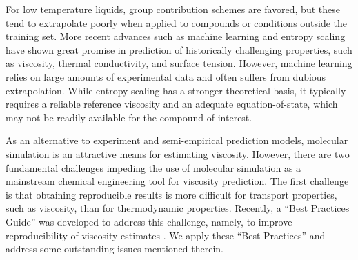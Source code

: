 \documentclass[preprint,review,12pt]{elsarticle}
\begin{document}
    For low temperature liquids, group contribution schemes are favored, but these tend to extrapolate poorly when applied to compounds or conditions outside the training set. More recent advances such as machine learning \cite{Mulero2017,Lee2017} and entropy scaling \cite{Lotgering2015} have shown great promise in prediction of historically challenging properties, such as viscosity, thermal conductivity, and surface tension. However, machine learning relies on large amounts of experimental data and often suffers from dubious extrapolation. While entropy scaling has a stronger theoretical basis, it typically requires a reliable reference viscosity and an adequate equation-of-state, which may not be readily available for the compound of interest.
	
	
	
	
	
	
	
	As an alternative to experiment and semi-empirical prediction models, molecular simulation is an attractive means for estimating viscosity. However, there are two fundamental challenges impeding the use of molecular simulation as a mainstream chemical engineering tool for viscosity prediction. The first challenge is that obtaining reproducible results is more difficult for transport properties, such as viscosity, than for thermodynamic properties. Recently, a ``Best Practices Guide'' was developed to address this challenge, namely, to improve reproducibility of viscosity estimates \cite{Maginn2018}. We apply these ``Best Practices'' and address some outstanding issues mentioned therein.
	
\end{document}
